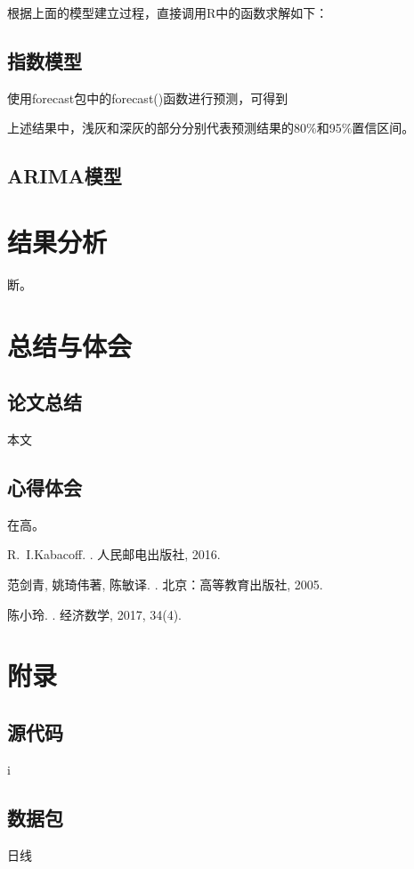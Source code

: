 \documentclass[10pt]{ctexart}
\begin{document}
根据上面的模型建立过程，直接调用R中的函数求解如下：

\subsection{指数模型}

使用forecast包中的forecast()函数进行预测，可得到



上述结果中，浅灰和深灰的部分分别代表预测结果的80\%和95\%置信区间。

\subsection{ARIMA模型}




\section{结果分析}

断。


\section{总结与体会}

\subsection{论文总结}

本文

\subsection{心得体会}

在高。


\begin{thebibliography}{1}
	
	R.~I.Kabacoff.
	.
	\newblock 人民邮电出版社, 2016.
	
	
	范剑青, 姚琦伟著, 陈敏译.
	.
	\newblock  北京：高等教育出版社, 2005.
	
	
	陈小玲.
	.
	\newblock 经济数学, 2017, 34(4).
	
\end{thebibliography}


\section{附录}

\subsection{源代码}

i


\subsection{数据包}

日线
\end{document}
